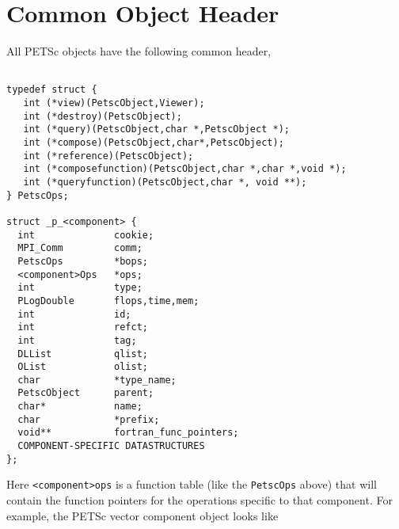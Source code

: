 \section{Common Object Header}

All PETSc objects have the following common header,

\begin{verbatim}

typedef struct {
   int (*view)(PetscObject,Viewer);
   int (*destroy)(PetscObject);
   int (*query)(PetscObject,char *,PetscObject *);
   int (*compose)(PetscObject,char*,PetscObject);
   int (*reference)(PetscObject);
   int (*composefunction)(PetscObject,char *,char *,void *);
   int (*queryfunction)(PetscObject,char *, void **);
} PetscOps;

struct _p_<component> {
  int              cookie;                                  
  MPI_Comm         comm;                                    
  PetscOps         *bops;                                   
  <component>Ops   *ops;                                    
  int              type;                                    
  PLogDouble       flops,time,mem;                          
  int              id;                                      
  int              refct;                                   
  int              tag;                                     
  DLList           qlist;                                   
  OList            olist;                                   
  char             *type_name;                              
  PetscObject      parent;                                  
  char*            name;                                    
  char             *prefix;                                 
  void**           fortran_func_pointers;       
  COMPONENT-SPECIFIC DATASTRUCTURES
}; 

\end{verbatim}
Here {\tt <component>ops} is a function table (like the {\tt PetscOps} above) that 
will contain the function pointers for the operations specific to that component.
For example, the PETSc vector component object looks like

